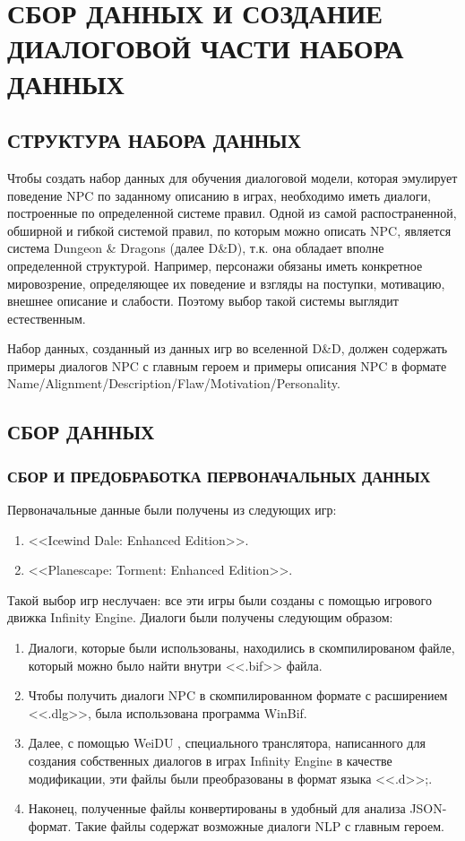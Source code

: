 \section{СБОР ДАННЫХ И СОЗДАНИЕ ДИАЛОГОВОЙ ЧАСТИ НАБОРА ДАННЫХ}
\subsection{СТРУКТУРА НАБОРА ДАННЫХ}
Чтобы создать набор данных для обучения диалоговой модели, которая эмулирует поведение NPC по заданному описанию в играх, необходимо иметь диалоги, построенные по определенной системе правил. Одной из самой распостраненной, обширной и гибкой системой правил, по которым можно описать NPC, является система Dungeon \& Dragons (далее D\&D), т.к. она обладает вполне определенной структурой. Например, персонажи обязаны иметь конкретное мировозрение, определяющее их поведение и взгляды на поступки, мотивацию, внешнее описание и слабости. Поэтому выбор такой системы выглядит естественным. 

Набор данных, созданный из данных игр во вселенной D\&D, должен содержать примеры диалогов NPC с главным героем и примеры описания NPC в формате Name/Alignment/Description/Flaw/Motivation/Personality.

\subsection{СБОР ДАННЫХ}
\subsubsection{СБОР И ПРЕДОБРАБОТКА ПЕРВОНАЧАЛЬНЫХ ДАННЫХ}
Первоначальные данные были получены из следующих игр: 
\begin{enumerate}
      \item <<Icewind Dale: Enhanced Edition>>.
      \item <<Planescape: Torment: Enhanced Edition>>.
\end{enumerate}

Такой выбор игр неслучаен: все эти игры были созданы с помощью  игрового движка Infinity Engine. Диалоги были получены следующим образом:
\begin{enumerate}
      \item Диалоги, которые были использованы, находились в скомпилированом файле, который можно было найти внутри <<.bif>> файла.
      \item Чтобы получить диалоги NPC в скомпилированном формате с расширением <<.dlg>>, была использована программа WinBif.
      \item Далее, с помощью WeiDU \cite{weidu-repo}, специального транслятора,
            написанного для создания собственных диалогов в играх Infinity Engine в качестве модификации, эти файлы были преобразованы в формат языка <<.d>>;.
      \item Наконец, полученные файлы конвертированы в удобный для анализа JSON-формат. Такие файлы содержат возможные диалоги NLP с главным героем.
\end{enumerate}

